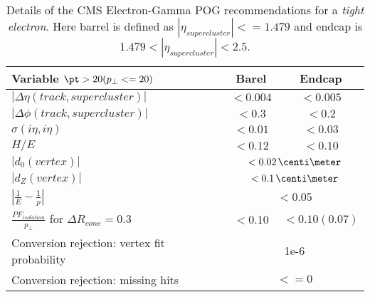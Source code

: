 \begin{table}[!htp]
  
\begin{tabular}{|l|c|c|}
\hline
Variable  $\pt > 20 (p_{\perp} <= 20)$ & Barel & Endcap \\
\hline\hline
$| \Delta\eta(track,supercluster) |$                           & $<0.004$ & $<0.005$ \\
$| \Delta\phi(track,supercluster) |$                           & $<0.3  $ & $<0.2  $ \\
$ \sigma(i\eta,i\eta)$                                         & $<0.01 $ & $<0.03 $ \\
$H/E$                                                          & $<0.12 $ & $<0.10 $ \\
\cline{2-3}
$|d_{0}(vertex)|$                                              & \multicolumn{2}{c|}{$<0.02\,\centi\meter$} \\
$|d_{Z}(vertex)|$                                              & \multicolumn{2}{c|}{$<0.1\,\centi\meter$}  \\
$|\frac{1}{E}-\frac{1}{p}| $                                   & \multicolumn{2}{c|}{$<0.05$} \\
\cline{2-3}
$\frac{PF_{isolation}}{p_{\perp}}$ for $ \Delta R_{cone}=0.3$ & $<0.10 $ & $<0.10(0.07)$ \\
\cline{2-3}
Conversion rejection: vertex fit probability                   & \multicolumn{2}{c|}{1e-6}  \\
Conversion rejection: missing hits                             & \multicolumn{2}{c|}{$<=0$} \\
\hline
\end{tabular}
\caption{Details of the \gls{CMS} Electron-Gamma \gls{POG} recommendations for a \textit{tight electron}. Here barrel is defined as $ |\eta_{supercluster}|<=1.479 $ and endcap is $ 1.479 < |\eta_{supercluster}| < 2.5 $.}
\label{TABLE:PhysicsObjects_ElectronPOG_CutBased_VetoElectronRequirements}
\end{table}
